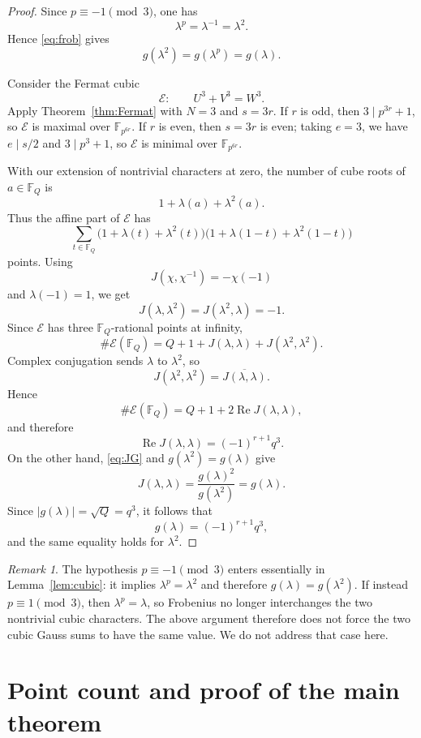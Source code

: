 \documentclass[3p,10pt]{elsarticle}
\theoremstyle{remark}
\newtheorem{remark}[theorem]{Remark}
\newcommand{\cE}{\mathcal{E}}
\newcommand{\F}{\mathbb{F}}
\newcommand{\Ree}{\operatorname{Re}}
\begin{document}
\begin{proof}
Since $p\equiv -1\pmod 3$, one has
\[
\lambda^p=\lambda^{-1}=\lambda^2.
\]
Hence \eqref{eq:frob} gives
\[
g(\lambda^2)=g(\lambda^p)=g(\lambda).
\]

Consider the Fermat cubic
\[
\cE:\qquad U^3+V^3=W^3.
\]
Apply Theorem~\ref{thm:Fermat} with $N=3$ and $s=3r$. If $r$ is odd, then $3\mid p^{3r}+1$, so $\cE$ is maximal over $\F_{p^{6r}}$. If $r$ is even, then $s=3r$ is even; taking $e=3$, we have $e\mid s/2$ and $3\mid p^3+1$, so $\cE$ is minimal over $\F_{p^{6r}}$.

With our extension of nontrivial characters at zero, the number of cube roots of $a\in\F_Q$ is
\[
1+\lambda(a)+\lambda^2(a).
\]
Thus the affine part of $\cE$ has
\[
\sum_{t\in\F_Q}
\bigl(1+\lambda(t)+\lambda^2(t)\bigr)
\bigl(1+\lambda(1-t)+\lambda^2(1-t)\bigr)
\]
points. Using
\[
J(\chi,\chi^{-1})=-\chi(-1)
\]
and $\lambda(-1)=1$, we get
\[
J(\lambda,\lambda^2)=J(\lambda^2,\lambda)=-1.
\]
Since $\cE$ has three $\F_Q$-rational points at infinity,
\[
\#\cE(\F_Q)=Q+1+J(\lambda,\lambda)+J(\lambda^2,\lambda^2).
\]
Complex conjugation sends $\lambda$ to $\lambda^2$, so
\[
J(\lambda^2,\lambda^2)=\overline{J(\lambda,\lambda)}.
\]
Hence
\[
\#\cE(\F_Q)=Q+1+2\Ree J(\lambda,\lambda),
\]
and therefore
\[
\Ree J(\lambda,\lambda)=(-1)^{r+1}q^3.
\]
On the other hand, \eqref{eq:JG} and $g(\lambda^2)=g(\lambda)$ give
\[
J(\lambda,\lambda)=\frac{g(\lambda)^2}{g(\lambda^2)}=g(\lambda).
\]
Since $|g(\lambda)|=\sqrt Q=q^3$, it follows that
\[
g(\lambda)=(-1)^{r+1}q^3,
\]
and the same equality holds for $\lambda^2$.
\end{proof}

\begin{remark}\label{rem:p1mod3}
The hypothesis $p\equiv -1\pmod 3$ enters essentially in Lemma~\ref{lem:cubic}: it implies $\lambda^p=\lambda^2$ and therefore $g(\lambda)=g(\lambda^2)$. If instead $p\equiv 1\pmod 3$, then $\lambda^p=\lambda$, so Frobenius no longer interchanges the two nontrivial cubic characters. The above argument therefore does not force the two cubic Gauss sums to have the same value. We do not address that case here.
\end{remark}

\section{Point count and proof of the main theorem}\label{sec:main}
\end{document}
